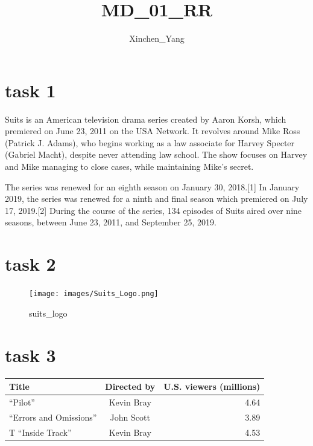 \documentclass[
  letterpaper,
  DIV=11,
  numbers=noendperiod]{scrartcl}
\title{MD\_01\_RR}
\author{Xinchen\_Yang}
\date{}
\begin{document}
\maketitle
\ifdefined\Shaded\renewenvironment{Shaded}{\begin{tcolorbox}[borderline west={3pt}{0pt}{shadecolor}, sharp corners, enhanced, breakable, frame hidden, interior hidden, boxrule=0pt]}{\end{tcolorbox}}\fi

\hypertarget{task-1}{%
\section{task 1}\label{task-1}}

Suits is an American television drama series created by Aaron Korsh,
which premiered on June 23, 2011 on the USA Network. It revolves around
Mike Ross (Patrick J. Adams), who begins working as a law associate for
Harvey Specter (Gabriel Macht), despite never attending law school. The
show focuses on Harvey and Mike managing to close cases, while
maintaining Mike's secret.

The series was renewed for an eighth season on January 30, 2018.{[}1{]}
In January 2019, the series was renewed for a ninth and final season
which premiered on July 17, 2019.{[}2{]} During the course of the
series, 134 episodes of Suits aired over nine seasons, between June 23,
2011, and September 25, 2019.

\hypertarget{task-2}{%
\section{task 2}\label{task-2}}

\begin{figure}

{\centering \texttt{[image: images/Suits\_Logo.png]}

}

\caption{suits\_logo}

\end{figure}

\hypertarget{task-3}{%
\section{task 3}\label{task-3}}

\begin{longtable}[]{@{}lcr@{}}
\toprule()
Title & Directed by & U.S. viewers (millions) \\
\midrule()
\endhead
``Pilot'' & Kevin Bray & 4.64 \\
``Errors and Omissions'' & John Scott & 3.89 \\
T ``Inside Track'' & Kevin Bray & 4.53 \\
\bottomrule()
\end{longtable}
\end{document}
